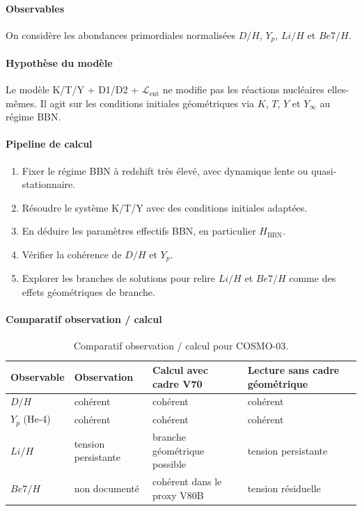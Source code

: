 \documentclass[11pt,a4paper]{article}
\newcommand{\Lent}{\mathcal{L}_{\mathrm{ent}}}
\begin{document}
\paragraph{Observables}
On considère les abondances primordiales normalisées $D/H$, $Y_p$, $Li/H$ et $Be7/H$.

\paragraph{Hypothèse du modèle}
Le modèle K/T/Y + D1/D2 + $\Lent$ ne modifie pas les réactions nucléaires elles-mêmes. Il agit sur les conditions initiales géométriques via $K$, $T$, $Y$ et $Y_\infty$ au régime BBN.

\paragraph{Pipeline de calcul}
\begin{enumerate}
	\item Fixer le régime BBN à redshift très élevé, avec dynamique lente ou quasi-stationnaire.
	\item Résoudre le système K/T/Y avec des conditions initiales adaptées.
	\item En déduire les paramètres effectifs BBN, en particulier $H_{\mathrm{BBN}}$.
	\item Vérifier la cohérence de $D/H$ et $Y_p$.
	\item Explorer les branches de solutions pour relire $Li/H$ et $Be7/H$ comme des effets géométriques de branche.
\end{enumerate}

\paragraph{Comparatif observation / calcul}
\begin{table}[htbp]
\centering
\begin{tabular}{>{\raggedright\arraybackslash}p{3cm} >{\centering\arraybackslash}p{3cm} >{\centering\arraybackslash}p{3.5cm} >{\centering\arraybackslash}p{3.5cm}}
\toprule
Observable & Observation & Calcul avec cadre V70 & Lecture sans cadre géométrique \\
\midrule
$D/H$ & cohérent & cohérent & cohérent \\
$Y_p$ (He-4) & cohérent & cohérent & cohérent \\
$Li/H$ & tension persistante & branche géométrique possible & tension persistante \\
$Be7/H$ & non documenté & cohérent dans le proxy V80B & tension résiduelle \\
\bottomrule
\end{tabular}
\caption{Comparatif observation / calcul pour COSMO-03.}
\end{table}
\end{document}
